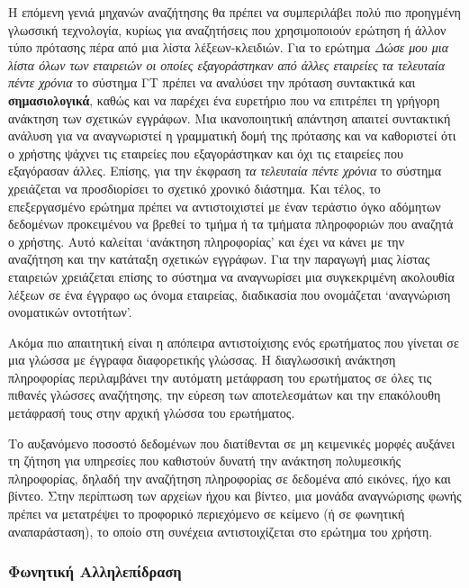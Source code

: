 \documentclass[]{../../metanetpaper}
\begin{document}
\begin{multicols}{2}
Η επόμενη γενιά μηχανών αναζήτησης θα πρέπει να συμπεριλάβει πολύ πιο προηγμένη γλωσσική τεχνολογία, κυρίως για αναζητήσεις που χρησιμοποιούν  ερώτηση ή άλλον τύπο πρότασης πέρα από μια λίστα λέξεων-κλειδιών. Για το ερώτημα \textit{Δώσε μου μια λίστα όλων των εταιρειών οι οποίες εξαγοράστηκαν από άλλες εταιρείες τα τελευταία πέντε χρόνια} το σύστημα ΓΤ πρέπει να αναλύσει την πρόταση συντακτικά και  \textbf{σημασιολογικά}, καθώς και να παρέχει ένα ευρετήριο που να επιτρέπει τη γρήγορη ανάκτηση των σχετικών εγγράφων. Μια ικανοποιητική απάντηση απαιτεί συντακτική ανάλυση για να αναγνωριστεί η γραμματική δομή της πρότασης και να καθοριστεί ότι ο χρήστης ψάχνει τις εταιρείες που εξαγοράστηκαν και όχι τις εταιρείες που εξαγόρασαν άλλες. Επίσης, για την έκφραση \textit{τα τελευταία πέντε χρόνια} το σύστημα χρειάζεται να προσδιορίσει το σχετικό χρονικό διάστημα. Και τέλος, το επεξεργασμένο ερώτημα πρέπει να αντιστοιχιστεί με έναν τεράστιο όγκο αδόμητων δεδομένων προκειμένου να βρεθεί το τμήμα ή τα τμήματα πληροφοριών που αναζητά ο χρήστης. Αυτό καλείται ‘ανάκτηση πληροφορίας’ και έχει να κάνει με την αναζήτηση και την κατάταξη σχετικών εγγράφων. Για την παραγωγή μιας λίστας εταιρειών χρειάζεται επίσης το σύστημα να αναγνωρίσει  μια συγκεκριμένη ακολουθία λέξεων σε ένα έγγραφο ως όνομα εταιρείας,  διαδικασία που ονομάζεται ‘αναγνώριση ονοματικών οντοτήτων’.


Ακόμα πιο απαιτητική είναι η απόπειρα αντιστοίχισης ενός ερωτήματος που γίνεται σε μια γλώσσα με έγγραφα διαφορετικής γλώσσας. Η διαγλωσσική ανάκτηση πληροφορίας περιλαμβάνει την αυτόματη μετάφραση του ερωτήματος σε όλες τις πιθανές γλώσσες αναζήτησης, την εύρεση των αποτελεσμάτων και  την επακόλουθη μετάφρασή τους  στην αρχική γλώσσα του ερωτήματος.

Το αυξανόμενο ποσοστό δεδομένων που διατίθενται σε μη κειμενικές μορφές αυξάνει τη ζήτηση για υπηρεσίες που καθιστούν δυνατή την ανάκτηση πολυμεσικής πληροφορίας, δηλαδή την αναζήτηση πληροφορίας σε δεδομένα από εικόνες, ήχο και βίντεο. Στην περίπτωση των αρχείων ήχου και βίντεο, μια μονάδα αναγνώρισης φωνής πρέπει να μετατρέψει το προφορικό περιεχόμενο σε κείμενο (ή σε φωνητική αναπαράσταση), το οποίο στη συνέχεια αντιστοιχίζεται στο ερώτημα του χρήστη.

\subsubsection{Φωνητική Αλληλεπίδραση}


\end{multicols}
\end{document}
